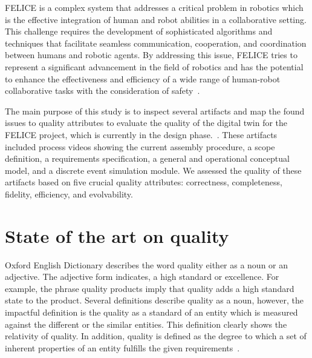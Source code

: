 \documentclass{llncs}
\begin{document}
    FELICE is a complex system that addresses a critical problem in robotics which is the effective integration of human and robot abilities in a collaborative setting. 
    This challenge requires the development of sophisticated algorithms and techniques that facilitate seamless communication, cooperation, and coordination between humans and robotic agents. 
    By addressing this issue, FELICE tries to represent a significant advancement in the field of robotics and has the potential to enhance the effectiveness and efficiency of a wide range of 
    human-robot collaborative tasks with the consideration of safety~\cite{FELICE}.

    The main purpose of this study is to inspect several artifacts and map the found issues to quality attributes to evaluate the quality of the digital twin for the FELICE project, which is currently in the design phase.~\cite{FELICE}. These artifacts included process videos showing the current 
    assembly procedure, a scope definition, a requirements specification, a general and operational conceptual model, 
    and a discrete event simulation module. We assessed the quality of these artifacts based on five crucial quality attributes: correctness, completeness, fidelity, efficiency, and evolvability.




    \section{State of the art on quality}
    Oxford English Dictionary describes the word quality either as a noun or an adjective. 
    The adjective form indicates, a high standard or excellence. For example, the phrase quality products imply 
    that quality adds a high standard state to the product. Several definitions describe quality 
    as a noun, however, the impactful definition is the quality as a standard of an entity which is measured against the 
    different or the similar entities\cite{OxfordDictionary}. This definition clearly shows the relativity of quality. In addition, quality is defined 
    as the degree to which a set of inherent properties of an entity fulfills the given requirements~\cite{ISO9000}.    
\end{document}
